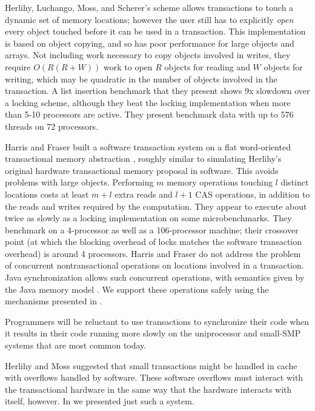 Herlihy, Luchango, Moss, and Scherer's scheme \cite{HerlihyLuMoSc03}
allows transactions to touch a dynamic set of memory locations;
however the user still has to explicitly \emph{open} every object touched
before it can be used in a transaction.  This implementation is based
on object copying, and so has poor performance for large objects and
arrays.  Not including work necessary to copy objects involved in
writes, they require $O(R(R+W))$ work to open $R$ objects for reading
and $W$ objects for writing, which may be quadratic in the number of objects
involved in the transaction.   A list insertion benchmark that they
present shows 9x slowdown over a locking scheme, although they beat the locking
implementation when more than 5-10 processors are active.  They
present benchmark data with up to 576 threads on 72 processors.

Harris and Fraser built a software transaction system on a flat
word-oriented transactional memory abstraction \cite{HarrisFr03},
roughly similar to simulating Herlihy's original hardware
transactional memory proposal in software.  This avoids problems with
large objects.  Performing $m$ memory operations touching $l$ distinct
locations costs at least $m+l$ extra reads and $l+1$ CAS operations, in
addition to the reads and writes required by the computation.
They appear to execute about twice as slowly as a locking
implementation on some microbenchmarks.  They benchmark on a
4-processor as well as a 106-processor machine; their crossover point
(at which the blocking overhead of locks matches the software
transaction overhead) is around 4 processors.
Harris and Fraser do not address the problem of
concurrent nontransactional operations on locations involved in a
transaction.  Java synchronization allows such concurrent operations,
with semantics given by the Java memory model \cite{MansonPu01a,MansonPu01b,MansonPuAd05}.
We support these operations safely using the mechanisms presented in
.

Programmers will be reluctant to use transactions to synchronize their
code when it results in their code running more slowly on the uniprocessor
and small-SMP systems that are most common today.

Herlihy and Moss \cite{HerlihyMo93} suggested that small transactions
might be handled in cache with overflows handled by software.  These
software overflows must interact with the transactional hardware in
the same way that the hardware interacts with itself, however.
In  we presented just such a system.


